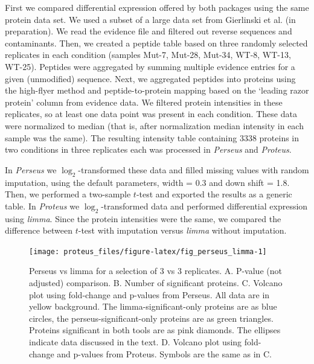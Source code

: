 \documentclass[]{article}
\begin{document}
First we compared differential expression offered by both packages using
the same protein data set. We used a subset of a large data set from
Gierlinski et al. (in preparation). We read the evidence file and
filtered out reverse sequences and contaminants. Then, we created a
peptide table based on three randomly selected replicates in each
condition (samples Mut-7, Mut-28, Mut-34, WT-8, WT-13, WT-25). Peptides
were aggregated by summing multiple evidence entries for a given
(unmodified) sequence. Next, we aggregated peptides into proteins using
the high-flyer method and peptide-to-protein mapping based on the
`leading razor protein' column from evidence data. We filtered protein
intensities in these replicates, so at least one data point was present
in each condition. These data were normalized to median (that is, after
normalization median intensity in each sample was the same). The
resulting intensity table containing 3338 proteins in two conditions in
three replicates each was processed in \emph{Perseus} and
\emph{Proteus}.

In \emph{Perseus} we \(\log_2\)-transformed these data and filled
missing values with random imputation, using the default parameters,
width = 0.3 and down shift = 1.8. Then, we performed a two-sample
\(t\)-test and exported the results as a generic table. In
\emph{Proteus} we \(\log_2\)-transformed data and performed differential
expression using \emph{limma}. Since the protein intensities were the
same, we compared the difference between \(t\)-test with imputation
versus \emph{limma} without imputation.

\begin{figure}[H]

{\centering \texttt{[image: proteus\_files/figure-latex/fig\_perseus\_limma-1]} 

}

\caption{\label{fig:perseus_limma}Perseus vs limma for a selection of 3 vs 3 replicates. A. P-value (not adjusted) comparison. B. Number of significant proteins. C. Volcano plot using fold-change and p-values from Perseus. All data are in yellow background. The limma-significant-only proteins are as blue circles, the perseus-significant-only proteins are as green triangles. Proteins significant in both tools are as pink diamonds. The ellipses indicate data discussed in the text. D. Volcano plot using fold-change and p-values from Proteus. Symbols are the same as in C.}\label{fig:fig_perseus_limma}
\end{figure}
\end{document}
